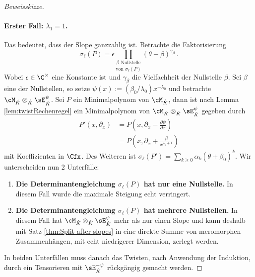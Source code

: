 \begin{proof}[Beweisskizze]
\paragraph{Erster Fall: $\lambda_1=1$.} Das bedeutet, dass der Slope ganzzahlig
ist. Betrachte die Faktorisierung
\[
\sigma_\ell(P)=
  \epsilon
  \underset{\text{von }\sigma_\ell(P)}{
  \prod_{\beta\text{ Nullstelle}} }
    (\theta-\beta)^{\gamma_\beta}\,.
\]
Wobei $\epsilon\in\C^\times$ eine Konstante ist und $\gamma_\beta$ die
Vielfachheit der Nullstelle $\beta$.
Sei $\beta$ eine der Nullstellen, so setze
$\psi(x):=(\beta_0/\lambda_0)x^{-\lambda_0}$ und betrachte $\cM_{\hat
K}\otimes_{\hat K} \sE_{\hat K}^{\psi}$.
Sei $P$ ein Minimalpolynom von $\cM_{\hat K}$, dann ist nach Lemma
\ref{lem:twistRechenregel} ein Minimalpolynom von 
$\cM_{\hat K}\otimes_{\hat K} \sE_{\hat K}^{\psi}$ gegeben durch
\begin{align*}
P'(x,\partial_x)&=P(x,\partial_x-\frac{\partial \psi}{\partial x})
\\&=P(x,\partial_x+\frac{\beta}{x^{\lambda_0+1}})
\end{align*}
mit Koeffizienten in
$\Cfx$.
Des Weiteren ist $\sigma_\ell(P')=\sum_{k\geq 0}\alpha_k(\theta+\beta_0)^k$.
Wir unterscheiden nun 2 Unterfälle:
\begin{enumerate}
\item \textbf{Die Determinantengleichung $\sigma_\ell(P)$ hat nur eine
Nullstelle.}
In diesem Fall wurde die maximale Steigung echt verringert.
\begin{comment}TODO: Hier weiter \end{comment}
\item \textbf{Die Determinantengleichung $\sigma_\ell(P)$ hat mehrere
Nullstellen.}
In diesem Fall hat $\cM_{\hat K}\otimes_{\hat K} \sE_{\hat K}^{\psi}$ mehr als
nur einen Slope und kann deshalb mit Satz \ref{thm:Split-after-slopes} in eine
direkte Summe von meromorphen Zusammenhängen, mit echt niedrigerer Dimension,
zerlegt werden.
\begin{comment}TODO: Hier weiter \end{comment}
\end{enumerate}
In beiden Unterfällen muss danach das Twisten, nach Anwendung der Induktion,
durch ein Tensorieren mit $\sE_{\hat K}^{-\psi}$ rückgängig gemacht werden.


\end{proof}

